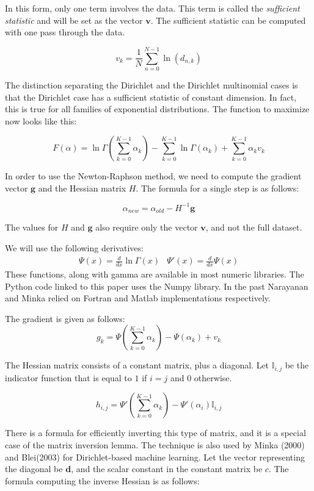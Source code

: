 \documentclass[twoside]{article}
\begin{document}
In this form, only one term involves the data. This term is called the \textit{sufficient statistic} and will be set as the vector $\mathbf{v}$. The sufficient statistic can be computed with one pass through the data.

\[v_k=\frac{1}{N}\sum_{n=0}^{N-1}\ln\left(d_{n,k}\right)\]

The distinction separating the Dirichlet and the Dirichlet multinomial cases is that the Dirichlet case has a sufficient statistic of constant dimension.  In fact, this is true for all families of exponential distributions\cite[pg 116]{robert}.  The function to maximize now looks like this:

\[
F(\alpha)=\ln\Gamma\left(\sum_{k=0}^{K-1}\alpha_k\right)-\sum_{k=0}^{K-1}\ln\Gamma\left(\alpha_k\right)+\sum_{k=0}^{K-1}\alpha_kv_k
\]

In order to use the Newton-Raphson method, we need to compute the gradient vector $\mathbf{g}$ and the Hessian matrix $H$.  The formula for a single step is as follows:

\[\alpha_{new}=\alpha_{old}-H^{-1}\mathbf{g}\]

The values for $H$ and $\mathbf{g}$ also require only the vector $\mathbf{v}$, and not the full dataset.

We will use the following derivatives:
\[
\begin{array}{cc} \Psi(x) = \frac{d}{dx} \ln\Gamma(x) & \Psi'(x) = \frac{d}{dx} \Psi(x)
\end{array}
\]
These functions, along with gamma are available in most numeric libraries.  The Python code linked to this paper uses the Numpy library.  In the past Narayanan\cite{narayanan} and Minka\cite{minka} relied on Fortran and Matlab implementations respectively.

The gradient is given as follows:
\[
g_k=\Psi\left(\sum_{k=0}^{K-1}\alpha_k\right)-\Psi(\alpha_k)+v_k
\]

The Hessian matrix consists of a constant matrix, plus a diagonal.  Let $\mathbb{I}_{i,j}$ be the indicator function that is equal to $1$ if $i = j$ and $0$ otherwise.

\[
h_{i,j}=\Psi'\left(\sum_{k=0}^{K-1}\alpha_k\right)-\Psi'(\alpha_i)\mathbb{I}_{i,j}
\]

There is a formula for efficiently inverting this type of matrix, and it is a special case of the matrix inversion lemma\cite{woodbury}.  The technique is also used by Minka\cite{minka} (2000) and Blei\cite[A.2]{blei}(2003) for Dirichlet-based machine learning.  Let the vector representing the diagonal be $\mathbf{d}$, and the scalar constant in the constant matrix be $c$.  The formula computing the inverse Hessian is as follows:
\end{document}
